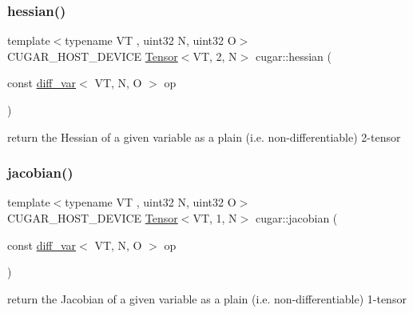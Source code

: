 \subsubsection{\texorpdfstring{hessian()}{hessian()}}
{\footnotesize\ttfamily template$<$typename VT , uint32 N, uint32 O$>$ \\
C\+U\+G\+A\+R\+\_\+\+H\+O\+S\+T\+\_\+\+D\+E\+V\+I\+CE \hyperlink{structcugar_1_1_tensor}{Tensor}$<$VT, 2, N$>$ cugar\+::hessian (\begin{DoxyParamCaption}\item[{const \hyperlink{structcugar_1_1diff__var}{diff\+\_\+var}$<$ VT, N, O $>$}]{op }\end{DoxyParamCaption})\hspace{0.3cm}{\ttfamily [inline]}}

return the Hessian of a given variable as a plain (i.\+e. non-\/differentiable) 2-\/tensor \mbox{\label{group___auto_diff_module_ga877e235be40a2961820c6caa2249adc7}} 
\subsubsection{\texorpdfstring{jacobian()}{jacobian()}}
{\footnotesize\ttfamily template$<$typename VT , uint32 N, uint32 O$>$ \\
C\+U\+G\+A\+R\+\_\+\+H\+O\+S\+T\+\_\+\+D\+E\+V\+I\+CE \hyperlink{structcugar_1_1_tensor}{Tensor}$<$VT, 1, N$>$ cugar\+::jacobian (\begin{DoxyParamCaption}\item[{const \hyperlink{structcugar_1_1diff__var}{diff\+\_\+var}$<$ VT, N, O $>$}]{op }\end{DoxyParamCaption})\hspace{0.3cm}{\ttfamily [inline]}}

return the Jacobian of a given variable as a plain (i.\+e. non-\/differentiable) 1-\/tensor \mbox{\label{group___auto_diff_module_ga1c7e88173ec4218a2a3f7545bc60c665}} 
